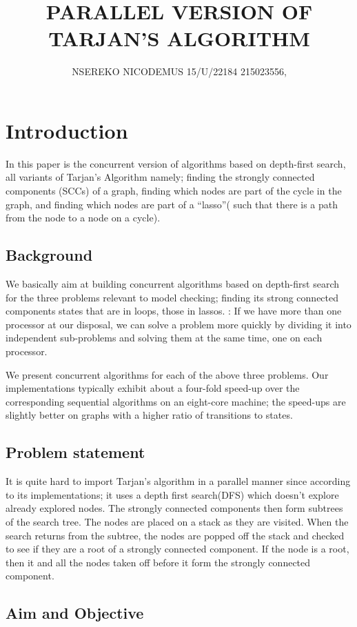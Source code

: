 \documentclass{article}
\title{PARALLEL VERSION OF TARJAN'S ALGORITHM}
\author{NSEREKO NICODEMUS   15/U/22184     215023556,    }
\begin{document}
\maketitle
\section{Introduction}{In this paper is the concurrent version of algorithms based on depth-first search, all variants of Tarjan’s Algorithm namely; finding the strongly connected components (SCCs) of a graph, finding which nodes are part of the cycle in the graph, and finding which nodes are part of a “lasso”( such that there is a path from the node to a node on a cycle).}
\subsection{Background}{We basically aim at building concurrent algorithms based on depth-first search \cite{ref2} for the three problems relevant to model checking; finding its strong connected components states that are in loops, those in lassos. : If we have more than one processor at our disposal, we can solve a problem more quickly by dividing it into independent sub-problems and solving them at the same time, one on each processor.}

{We present concurrent algorithms for each of the above three problems. Our implementations typically exhibit about a four-fold speed-up over the corresponding sequential algorithms on an eight-core machine; the speed-ups are slightly better on graphs with a higher ratio of transitions to states. }

\subsection{Problem statement}{It is quite hard to import Tarjan’s algorithm in a parallel manner since according to its implementations; it uses a depth first search(DFS) which doesn’t explore already explored nodes. The strongly connected components then form subtrees of the search tree. The nodes are placed on a stack as they are visited. When the search returns from the subtree, the nodes are popped off the stack and checked to see if they are a root of a strongly connected component. If the node is a root, then it and all the nodes taken off before it form the strongly connected component.}

\subsection{Aim and Objective}
\end{document}
